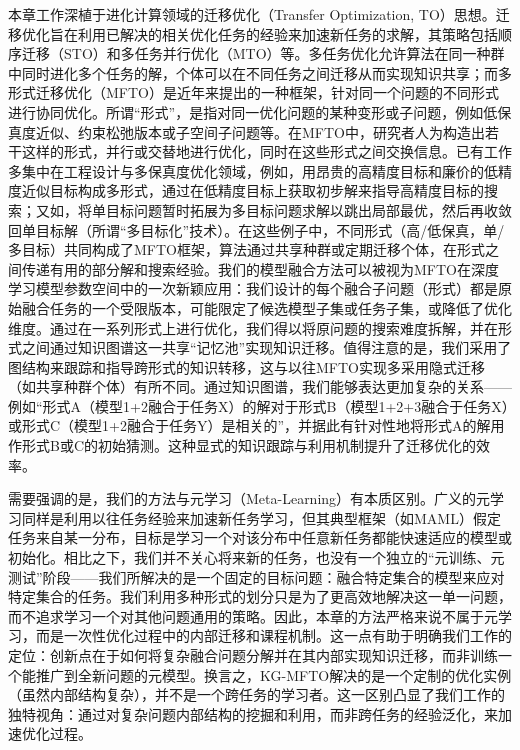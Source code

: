 \documentclass[../main.tex]{subfiles}
\begin{document}
本章工作深植于进化计算领域的迁移优化（Transfer Optimization, TO）思想。迁移优化旨在利用已解决的相关优化任务的经验来加速新任务的求解，其策略包括顺序迁移（STO）和多任务并行优化（MTO）等。多任务优化允许算法在同一种群中同时进化多个任务的解，个体可以在不同任务之间迁移从而实现知识共享；而多形式迁移优化（MFTO）是近年来提出的一种框架，针对同一个问题的不同形式进行协同优化。所谓“形式”，是指对同一优化问题的某种变形或子问题，例如低保真度近似、约束松弛版本或子空间子问题等。在MFTO中，研究者人为构造出若干这样的形式，并行或交替地进行优化，同时在这些形式之间交换信息。已有工作多集中在工程设计与多保真度优化领域，例如，用昂贵的高精度目标和廉价的低精度近似目标构成多形式，通过在低精度目标上获取初步解来指导高精度目标的搜索；又如，将单目标问题暂时拓展为多目标问题求解以跳出局部最优，然后再收敛回单目标解（所谓“多目标化”技术）。在这些例子中，不同形式（高/低保真，单/多目标）共同构成了MFTO框架，算法通过共享种群或定期迁移个体，在形式之间传递有用的部分解和搜索经验。我们的模型融合方法可以被视为MFTO在深度学习模型参数空间中的一次新颖应用：我们设计的每个融合子问题（形式）都是原始融合任务的一个受限版本，可能限定了候选模型子集或任务子集，或降低了优化维度。通过在一系列形式上进行优化，我们得以将原问题的搜索难度拆解，并在形式之间通过知识图谱这一共享“记忆池”实现知识迁移。值得注意的是，我们采用了图结构来跟踪和指导跨形式的知识转移，这与以往MFTO实现多采用隐式迁移（如共享种群个体）有所不同。通过知识图谱，我们能够表达更加复杂的关系——例如“形式A（模型1+2融合于任务X）的解对于形式B（模型1+2+3融合于任务X）或形式C（模型1+2融合于任务Y）是相关的”，并据此有针对性地将形式A的解用作形式B或C的初始猜测。这种显式的知识跟踪与利用机制提升了迁移优化的效率。

需要强调的是，我们的方法与元学习（Meta-Learning）有本质区别。广义的元学习同样是利用以往任务经验来加速新任务学习，但其典型框架（如MAML）假定任务来自某一分布，目标是学习一个对该分布中任意新任务都能快速适应的模型或初始化。相比之下，我们并不关心将来新的任务，也没有一个独立的“元训练、元测试”阶段——我们所解决的是一个固定的目标问题：融合特定集合的模型来应对特定集合的任务。我们利用多种形式的划分只是为了更高效地解决这一单一问题，而不追求学习一个对其他问题通用的策略。因此，本章的方法严格来说不属于元学习，而是一次性优化过程中的内部迁移和课程机制。这一点有助于明确我们工作的定位：创新点在于如何将复杂融合问题分解并在其内部实现知识迁移，而非训练一个能推广到全新问题的元模型。换言之，KG-MFTO解决的是一个定制的优化实例（虽然内部结构复杂），并不是一个跨任务的学习者。这一区别凸显了我们工作的独特视角：通过对复杂问题内部结构的挖掘和利用，而非跨任务的经验泛化，来加速优化过程。
\end{document}
